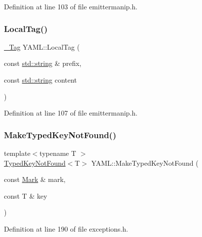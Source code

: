 Definition at line 103 of file emittermanip.\+h.

\mbox{\label{namespace_y_a_m_l_a0763bf556933f609f1e7488e632ab597}} 
\subsubsection{\texorpdfstring{LocalTag()}{LocalTag()}\hspace{0.1cm}{\footnotesize\ttfamily [2/2]}}
{\footnotesize\ttfamily \mbox{\hyperlink{struct_y_a_m_l_1_1___tag}{\+\_\+\+Tag}} Y\+A\+M\+L\+::\+Local\+Tag (\begin{DoxyParamCaption}\item[{const \mbox{\hyperlink{glad_8h_ac83513893df92266f79a515488701770}{std\+::string}} \&}]{prefix,  }\item[{const \mbox{\hyperlink{glad_8h_ac83513893df92266f79a515488701770}{std\+::string}}}]{content }\end{DoxyParamCaption})\hspace{0.3cm}{\ttfamily [inline]}}



Definition at line 107 of file emittermanip.\+h.

\mbox{\label{namespace_y_a_m_l_a54110ceefebc1c5889f1bc4be42c5cd6}} 
\subsubsection{\texorpdfstring{MakeTypedKeyNotFound()}{MakeTypedKeyNotFound()}}
{\footnotesize\ttfamily template$<$typename T $>$ \\
\mbox{\hyperlink{class_y_a_m_l_1_1_typed_key_not_found}{Typed\+Key\+Not\+Found}}$<$T$>$ Y\+A\+M\+L\+::\+Make\+Typed\+Key\+Not\+Found (\begin{DoxyParamCaption}\item[{const \mbox{\hyperlink{struct_y_a_m_l_1_1_mark}{Mark}} \&}]{mark,  }\item[{const T \&}]{key }\end{DoxyParamCaption})\hspace{0.3cm}{\ttfamily [inline]}}



Definition at line 190 of file exceptions.\+h.

